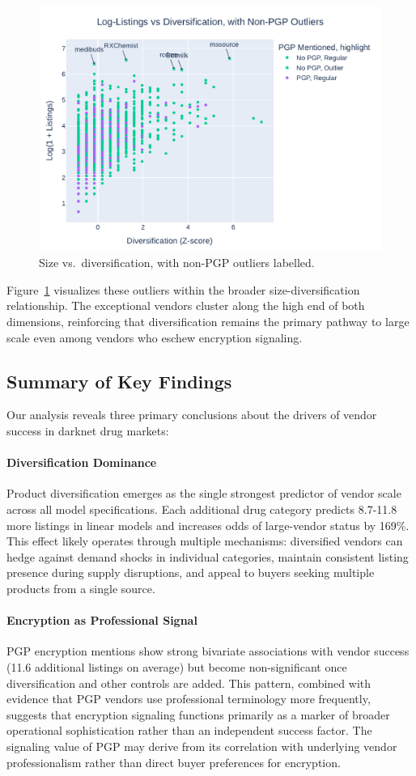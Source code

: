 \documentclass{article}
\begin{document}
\begin{figure}[htbp]
  \centering
  \includegraphics[width=.7\textwidth]{scatter_outliers_nonpgp.pdf}
  \caption{Size vs.\ diversification, with non-PGP outliers labelled.}
  \label{fig:outliers_nonpgp}
\end{figure}

Figure~\ref{fig:outliers_nonpgp} visualizes these outliers within the broader size-diversification relationship. The exceptional vendors cluster along the high end of both dimensions, reinforcing that diversification remains the primary pathway to large scale even among vendors who eschew encryption signaling.

\subsection{Summary of Key Findings}

Our analysis reveals three primary conclusions about the drivers of vendor success in darknet drug markets:

\paragraph{Diversification Dominance} Product diversification emerges as the single strongest predictor of vendor scale across all model specifications. Each additional drug category predicts 8.7-11.8 more listings in linear models and increases odds of large-vendor status by 169\%. This effect likely operates through multiple mechanisms: diversified vendors can hedge against demand shocks in individual categories, maintain consistent listing presence during supply disruptions, and appeal to buyers seeking multiple products from a single source.

\paragraph{Encryption as Professional Signal} PGP encryption mentions show strong bivariate associations with vendor success (11.6 additional listings on average) but become non-significant once diversification and other controls are added. This pattern, combined with evidence that PGP vendors use professional terminology more frequently, suggests that encryption signaling functions primarily as a marker of broader operational sophistication rather than an independent success factor. The signaling value of PGP may derive from its correlation with underlying vendor professionalism rather than direct buyer preferences for encryption.
\end{document}
